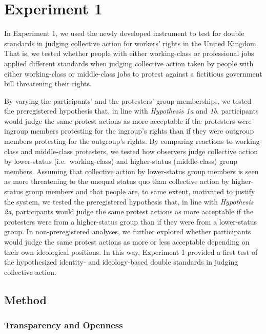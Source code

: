 \documentclass[12pt, letterpaper]{article}
\begin{document}
\hypertarget{experiment-1}{%
\section{Experiment 1}\label{experiment-1}}

In Experiment 1, we used the newly developed instrument to test for
double standards in judging collective action for workers' rights in the
United Kingdom. That is, we tested whether people with either
working-class or professional jobs applied different standards when
judging collective action taken by people with either working-class or
middle-class jobs to protest against a fictitious government bill
threatening their rights.

By varying the participants' and the protesters' group memberships, we
tested the preregistered hypothesis that, in line with \emph{Hypothesis
1a} and \emph{1b}, participants would judge the same protest actions as
more acceptable if the protesters were ingroup members protesting for
the ingroup's rights than if they were outgroup members protesting for
the outgroup's rights. By comparing reactions to working-class and
middle-class protesters, we tested how observers judge collective action
by lower-status (i.e.~working-class) and higher-status (middle-class)
group members. Assuming that collective action by lower-status group
members is seen as more threatening to the unequal status quo than
collective action by higher-status group members and that people are, to
same extent, motivated to justify the system, we tested the
preregistered hypothesis that, in line with \emph{Hypothesis 2a},
participants would judge the same protest actions as more acceptable if
the protesters were from a higher-status group than if they were from a
lower-status group. In non-preregistered analyses, we further explored
whether participants would judge the same protest actions as more or
less acceptable depending on their own ideological positions. In this
way, Experiment 1 provided a first test of the hypothesized identity-
and ideology-based double standards in judging collective action.

\hypertarget{method}{%
\subsection{Method}\label{method}}

\hypertarget{transparency-and-openness}{%
\subsubsection{Transparency and
Openness}\label{transparency-and-openness}}
\end{document}
